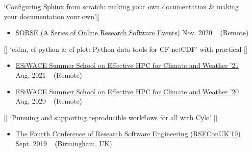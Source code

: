 \begin{talks}


    \talk
	{\faWrench `Configuring Sphinx from scratch: making your own documentation \& making your documentation your own'[\href{https://zenodo.org/records/3977886#.X6BP7nX7TeQ}{\small{\linkSymbol}}]}
	{
	\begin{itemize}[leftmargin=.4in]
	    \item \href{https://sorse.github.io/}{SORSE (A Series of Online Research Software Events)}
	    \hfill Nov. 2020 ~ (Remote)
	\end{itemize}
	}

    \talk
	{\faCommentingO{\Large{+}}\faWrench \hspace{1mm} [\faEnvelopeO] \hspace{1mm} `cfdm, cf-python \& cf-plot: Python data tools for CF-netCDF' with practical [\href{https://hps.vi4io.org/_media/events/2021/ss2021-ncas_data_tools_for_cfnetcdf.pdf}{\small{\linkSymbol}}]}
	{
	\begin{itemize}[leftmargin=.4in]
	    \item \href{https://hps.vi4io.org/events/2021/esiwace-school}{ESiWACE Summer School on Effective HPC for Climate and Weather '21}
	    \hfill Aug. 2021 ~ (Remote)
	    \item \href{https://hps.vi4io.org/events/2020/esiwace-school}{ESiWACE Summer School on Effective HPC for Climate and Weather '20}
	    \hfill Aug. 2020 ~ (Remote)
	\end{itemize}
	}

    \talk
	{\faCommentingO \hspace{1mm} [\faUserPlus] \hspace{1mm} `Pursuing and supporting reproducible workflows for all with Cylc' [\href{https://metomi.github.io/presentations/RSEConUK2019-Cylc-Talk/#/title-slide}{\small{\linkSymbol}}]}
	{
	\begin{itemize}[leftmargin=.4in]
	    \item \href{https://rseconuk2019.sched.com/}{The Fourth Conference of Research Software Engineering (RSEConUK'19)}
	    \hfill Sept. 2019 ~ (Birmingham, UK)
	\end{itemize}
	}

    
\end{talks}    
\vspace{-3mm}

